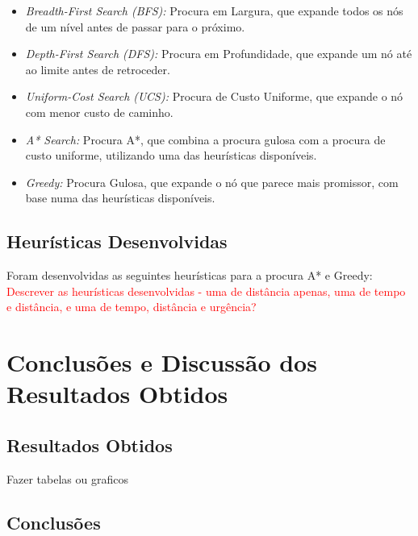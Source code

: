 \documentclass[a4paper,12pt]{scrreprt}
\begin{document}
\begin{itemize}
    \item \textit{Breadth-First Search (BFS):} Procura em Largura, que expande todos os nós de um nível antes de passar para o próximo.
    \item \textit{Depth-First Search (DFS):} Procura em Profundidade, que expande um nó até ao limite antes de retroceder.
    \item \textit{Uniform-Cost Search (UCS):} Procura de Custo Uniforme, que expande o nó com menor custo de caminho.
    \item \textit{A* Search:} Procura A*, que combina a procura gulosa com a procura de custo uniforme, utilizando uma das heurísticas
    disponíveis.
    \item \textit{Greedy:} Procura Gulosa, que expande o nó que parece mais promissor, com base numa das heurísticas disponíveis.
\end{itemize}

\section{Heurísticas Desenvolvidas}

Foram desenvolvidas as seguintes heurísticas para a procura A* e Greedy:
\textcolor{red}{Descrever as heurísticas desenvolvidas - uma de distância apenas, uma de tempo e distância,
e uma de tempo, distância e urgência?}





\chapter{Conclusões e Discussão dos Resultados Obtidos}

\section{Resultados Obtidos}
Fazer tabelas ou graficos

\section{Conclusões}
\end{document}
